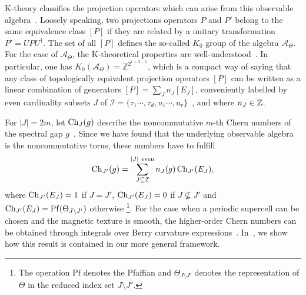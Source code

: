 \documentclass[
    10pt,
    aps,
    prl,
    twocolumn,
    floatfix,
    superscriptaddress
]{revtex4-2}
\newcommand{\SupplementalMaterial}{\cite{Note1}}
\newcommand{\revise}[1]{{#1}}
\begin{document}
\revise{
K-theory classifies the projection operators which can arise from this observable algebra~\cite{Park2008,Blackadar1998, Connes1994}.
Loosely speaking, two projections operators $P$ and $P'$ belong to the same equivalence class $[P]$ if they are related by a unitary transformation $P' = U P U^\dagger $. 
The set of all $[P]$ defines the so-called $K_0$ group of the algebra $\mathcal{A}_\Theta$.
For the case of $\mathcal{A}_\Theta$, the K-theoretical properties are well-understood~\cite{Prodan2016}.
In particular, one has $K_0( \mathcal{A}_\Theta) = \mathbb{Z}^{2^{r+d-1}}$, which is a compact way of saying that any class of topologically equivalent projection operators $[P]$ can be written as a linear combination of generators $[P] =\sum_J n_J [E_J]$, conveniently labelled by even cardinality subsets $J$ of $\mathcal{I}=\lbrace \tau_1 \cdots, \tau_d, u_1  \cdots, u_r \rbrace$~\SupplementalMaterial, and where $n_J \in {\mathbb Z}$.
}

\revise{
For $|J| = 2m$, let ${\rm Ch}_{J} (g)$ describe the noncommutative $m$-th Chern numbers of the spectral gap $g$~\cite{Prodan2013b, Liu2022}.
Since we have found that the underlying observable algebra is the noncommutative torus, these numbers have to fulfill~\cite{Prodan2016}
\begin{equation}
   {\rm Ch}_{J'} (g) =  \sum_{J \subseteq \mathcal{I} }^{|J|~\mathrm{even}}  n_J(g) \, {\rm Ch}_{J'}(E_J),
   \label{eq:chern_expansion}
\end{equation}
where ${\rm Ch}_{J'}(E_J)=1$ if $J=J'$,  ${\rm Ch}_{J'}(E_J)=0$ if $J \not\subseteq J'$ and ${\rm Ch}_{J'}(E_J) = \mathrm{Pf}( \Theta_{J\setminus J'})$ otherwise
\footnote{The operation $\mathrm{Pf}$ denotes the Pfaffian and $\Theta_{J\setminus J'}$ denotes the representation of $\Theta$ in the reduced index set $J\setminus J'$.}.
For the case when a periodic supercell can be chosen and the magnetic texture is smooth, the higher-order Chern numbers can be obtained through integrals over Berry curvature expressions~\cite{Qi2008, Kraus2013, Su2020}.
In~\SupplementalMaterial, we show how this result is contained in our more general framework.
}
\end{document}

